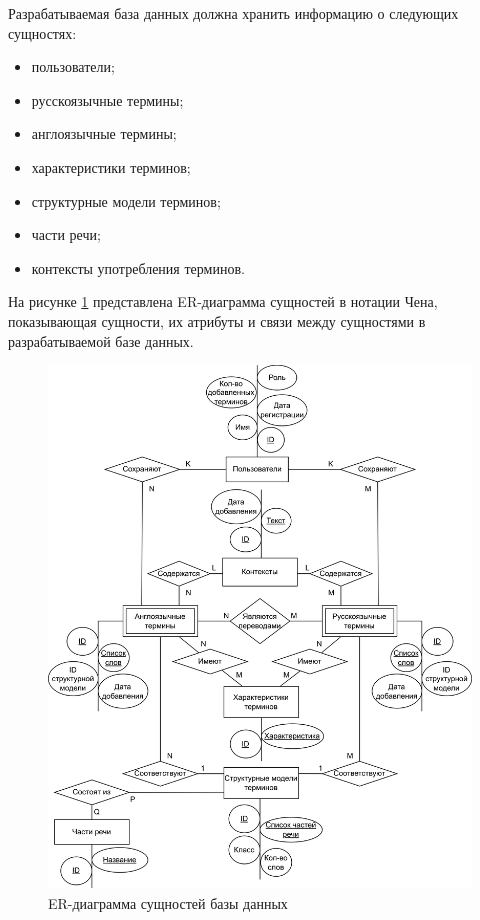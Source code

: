 Разрабатываемая база данных должна хранить информацию о следующих сущностях:

\begin{itemize}[label*=---]
	\item пользователи;
	\item русскоязычные термины;
	\item англоязычные термины;
	\item характеристики терминов;
	\item структурные модели терминов;
	\item части речи;
	\item контексты употребления терминов.
	
\end{itemize}

На рисунке \ref{fig:er} представлена ER-диаграмма сущностей в нотации Чена, показывающая сущности, их атрибуты и связи между сущностями в разрабатываемой базе данных.

\begin{figure}[h]
	\centering
	\includegraphics[width=\textwidth ]{img/ER/ER.drawio.png}
	\caption{ER-диаграмма сущностей базы данных}
	\label{fig:er}
\end{figure} 

